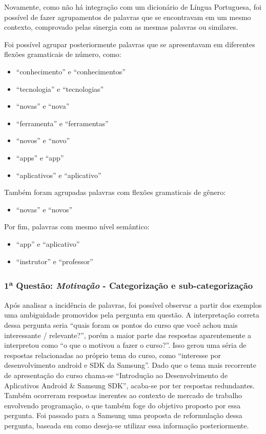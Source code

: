 Novamente, como não há integração com um dicionário de Língua Portuguesa, foi possível de fazer agrupamentos de palavras que se encontravam em um mesmo contexto, comprovado pelas sinergia com as mesmas palavras ou similares. 

Foi possível agrupar posteriormente palavras que se apresentavam em diferentes flexões gramaticais de número, como: 

\begin{itemize}
\item \enquote{conhecimento} e \enquote{conhecimentos}
\item \enquote{tecnologia} e \enquote{tecnologias} 
\item \enquote{novas} e \enquote{nova} 
\item \enquote{ferramenta} e \enquote{ferramentas} 
\item \enquote{novos} e \enquote{novo} 
\item \enquote{apps} e \enquote{app}
\item \enquote{aplicativos} e \enquote{aplicativo}
\end{itemize}

Também foram agrupadas palavras com flexões gramaticais de gênero:

\begin{itemize}
\item \enquote{novas} e \enquote{novos}
\end{itemize}

Por fim, palavras com mesmo nível semântico:

\begin{itemize}
\item \enquote{app} e \enquote{aplicativo}
\item \enquote{instrutor} e \enquote{professor}
\end{itemize}



\subsubsection*{1\textsuperscript{a} Questão: \textit{Motivação} - Categorização e sub-categorização }

Após analisar a incidência de palavras, foi possível observar a partir dos exemplos uma ambiguidade promovidos pela pergunta em questão. A interpretação correta dessa pergunta seria \enquote{quais foram os pontos do curso que você achou mais interessante / relevante?}, porém a maior parte das respostas aparentemente a interpretou como \enquote{o que o motivou a fazer o curso?}. Isso gerou uma séria de respostas relacionadas ao próprio tema do curso, como \enquote{interesse por desenvolvimento android e SDK da Samsung}. Dado que o tema mais recorrente de apresentação do curso chama-se \enquote{Introdução ao Desenvolvimento de Aplicativos Android \& Samsung SDK}, acaba-se por ter respostas redundantes. Também ocorreram respostas inerentes ao contexto de mercado de trabalho envolvendo programação, o que também foge do objetivo proposto por essa pergunta. Foi passado para a Samsung uma proposta de reformulação dessa pergunta, baseada em como deseja-se utilizar essa informação posteriormente.

